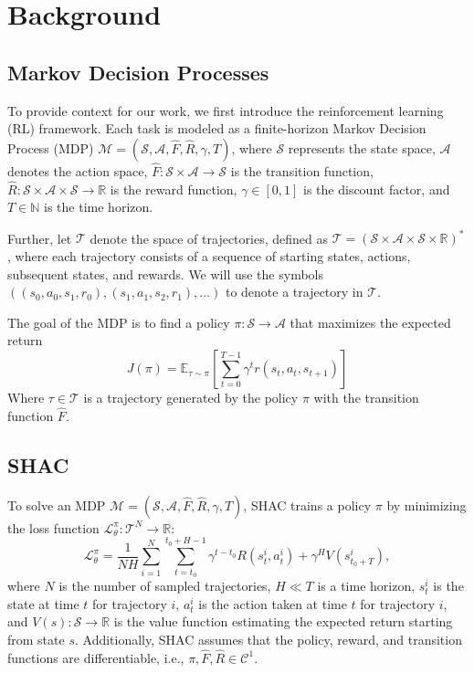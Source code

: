 \section{Background}

\subsection{Markov Decision Processes}
To provide context for our work, we first introduce the reinforcement learning (RL) framework. Each task is modeled as a finite-horizon Markov Decision Process (MDP) $\mathcal{M} = (\mathcal{S}, \mathcal{A}, \hat{F}, \hat{R}, \gamma, T)$, where $\mathcal{S}$ represents the state space, $\mathcal{A}$ denotes the action space, $\hat{F}:\mathcal{S} \times \mathcal{A} \rightarrow \mathcal{S}$ is the transition function, $\hat{R}:\mathcal{S} \times \mathcal{A} \times \mathcal{S} \rightarrow \mathbb{R}$ is the reward function, $\gamma \in [0, 1]$ is the discount factor, and $T \in \mathbb{N}$ is the time horizon.

Further, let $\mathcal{T}$ denote the space of trajectories, defined as $\mathcal{T} = (\mathcal{S} \times \mathcal{A} \times \mathcal{S} \times \mathbb{R})^*$, where each trajectory consists of a sequence of starting states, actions, subsequent states, and rewards. We will use the symbols $((s_0, a_0, s_1, r_0), (s_1, a_1, s_2, r_1), \ldots)$ to denote a trajectory in $\mathcal{T}$.

The goal of the MDP is to find a policy $\pi:\mathcal{S}\rightarrow\mathcal{A}$ that maximizes the expected return 
$$J(\pi) = \mathbb{E}_{\tau\sim\pi}\left[\sum_{t=0}^{T-1}\gamma^t r(s_t, a_t, s_{t+1})\right]$$
Where $\tau \in \mathcal{T}$ is a trajectory generated by the policy $\pi$ with the transition function $\hat{F}$.


\subsection{SHAC}

To solve an MDP $\mathcal{M} = (\mathcal{S}, \mathcal{A}, \hat{F}, \hat{R}, \gamma, T)$, SHAC trains a policy $\pi$ by minimizing the loss function $\mathcal{L}_\theta^{\pi}:\mathcal{T}^N\rightarrow\mathbb{R}$:  
$$\mathcal{L}_\theta^{\pi} = \frac{1}{NH}\sum_{i=1}^N \sum_{t=t_0}^{t_0+H-1} \gamma^{t-t_0} R(s_t^i, a_t^i) + \gamma^H V(s^i_{t_0+T}),$$  
where $N$ is the number of sampled trajectories, $H \ll T$ is a time horizon, $s_t^i$ is the state at time $t$ for trajectory $i$, $a_t^i$ is the action taken at time $t$ for trajectory $i$, and $V(s): \mathcal{S} \rightarrow \mathbb{R}$ is the value function estimating the expected return starting from state $s$. Additionally, SHAC assumes that the policy, reward, and transition functions are differentiable, i.e., $\pi, \hat{F}, \hat{R} \in \mathcal{C}^1$. 

